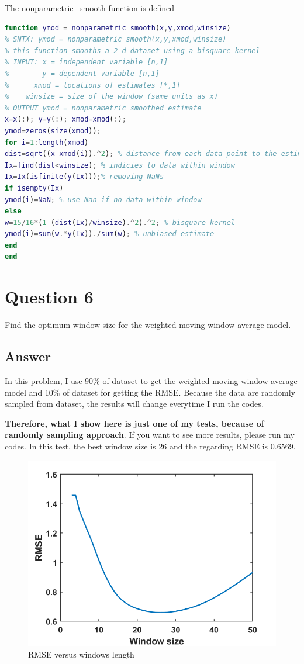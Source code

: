 \documentclass[
	12pt, %
]{fphw}
\begin{document}
The nonparametric\_smooth function is defined

\begin{lstlisting}[language=Matlab,escapeinside=``]
function ymod = nonparametric_smooth(x,y,xmod,winsize)
% SNTX: ymod = nonparametric_smooth(x,y,xmod,winsize)
% this function smooths a 2-d dataset using a bisquare kernel
% INPUT: x = independent variable [n,1]
%        y = dependent variable [n,1]
%      xmod = locations of estimates [*,1]
%    winsize = size of the window (same units as x)
% OUTPUT ymod = nonparametric smoothed estimate
x=x(:); y=y(:); xmod=xmod(:);
ymod=zeros(size(xmod));
for i=1:length(xmod)
dist=sqrt((x-xmod(i)).^2); % distance from each data point to the estimate location
Ix=find(dist<winsize); % indicies to data within window
Ix=Ix(isfinite(y(Ix)));% removing NaNs
if isempty(Ix)
ymod(i)=NaN; % use Nan if no data within window
else
w=15/16*(1-(dist(Ix)/winsize).^2).^2; % bisquare kernel
ymod(i)=sum(w.*y(Ix))./sum(w); % unbiased estimate
end
end


\end{lstlisting}

\clearpage
\section*{Question 6 }

\begin{problem}
Find the optimum window size for the weighted moving window average model.
	
\end{problem}

\subsection*{Answer}


In this problem, I use 90\% of dataset to get the weighted moving window average model and 10\% of dataset for getting the RMSE. Because the data are randomly sampled from dataset, the results will change everytime I run the codes.

\textbf{Therefore, what I show here is just one of my tests, because of randomly sampling approach}. If you want to see more results, please run my codes. In this test, the best window size is 26 and the regarding RMSE is 0.6569.


\begin{figure}[htbp]
	\centering
	\includegraphics[width=0.6\columnwidth]{Q6_1.png} 
	\caption{RMSE versus windows length}
\end{figure}
\end{document}
